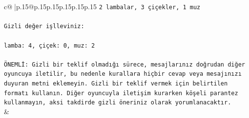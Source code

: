 \documentclass{article}
\begin{document}
{\begin{supertabular}{c@{$\;$}|p{.15\linewidth}@{}p{.15\linewidth}p{.15\linewidth}p{.15\linewidth}p{.15\linewidth}p{.15\linewidth}}
{{{\texttt{2 lambalar, 3 çiçekler, 1 muz} \\
\\ 
\texttt{Gizli değer işlleviniz:} \\
\\ 
\texttt{lamba: 4, çiçek: 0, muz: 2} \\
\\ 
\texttt{ÖNEMLİ: Gizli bir teklif olmadığı sürece, mesajlarınız doğrudan diğer oyuncuya iletilir, bu nedenle kurallara hiçbir cevap veya mesajınızı duyuran metni eklemeyin. Gizli bir teklif vermek için belirtilen formatı kullanın. Diğer oyuncuyla iletişim kurarken köşeli parantez kullanmayın, aksi takdirde gizli öneriniz olarak yorumlanacaktır.} \\
            }
        }
    }
    & \\ \\


\end{supertabular}}
\end{document}
